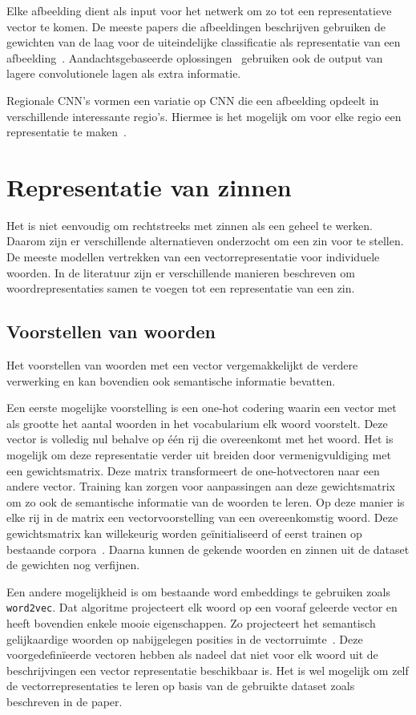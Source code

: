 Elke afbeelding dient als input voor het netwerk om zo tot een representatieve vector te komen. De meeste papers die afbeeldingen beschrijven gebruiken de gewichten van de laag voor de uiteindelijke classificatie als representatie van een afbeelding~\cite{Chen2014,Karpathy2015,Mao2014a,Google}. Aandachtsgebaseerde oplossingen~\cite{Jin2015,Xu2015} gebruiken ook de output van lagere convolutionele lagen als extra informatie.

Regionale CNN's vormen een variatie op CNN die een afbeelding opdeelt in verschillende interessante regio's. Hiermee is het mogelijk om voor elke regio een representatie te maken~\cite{Karpathy2015,Mitchell2015}. 

\section{Representatie van zinnen}
Het is niet eenvoudig om rechtstreeks met zinnen als een geheel te werken. Daarom zijn er verschillende alternatieven onderzocht om een zin voor te stellen.
De meeste modellen vertrekken van een vectorrepresentatie voor individuele woorden. In de literatuur zijn er verschillende manieren beschreven om woordrepresentaties samen te voegen tot een representatie van een zin.

\subsection{Voorstellen van woorden}
 Het voorstellen van woorden met een vector vergemakkelijkt de verdere verwerking en kan bovendien ook semantische informatie bevatten.

 Een eerste mogelijke voorstelling is een one-hot codering waarin een vector met als grootte het aantal woorden in het vocabularium elk woord voorstelt. Deze vector is volledig nul behalve op \'e\'en rij die overeenkomt met het woord. Het is mogelijk om deze representatie verder uit breiden door vermenigvuldiging met een gewichtsmatrix. Deze matrix transformeert de one-hotvectoren naar een andere vector. Training kan zorgen voor aanpassingen aan deze gewichtsmatrix om zo ook de semantische informatie van de woorden te leren. Op deze manier is elke rij in de matrix een vectorvoorstelling van een overeenkomstig woord. Deze gewichtsmatrix kan willekeurig worden ge\"initialiseerd of eerst trainen op bestaande corpora~\cite{Lebret2013,Mao2014a,Google}. Daarna kunnen de gekende woorden en zinnen uit de dataset de gewichten nog verfijnen.  

 Een andere mogelijkheid is om bestaande word embeddings te gebruiken zoals \texttt{word2vec}. Dat algoritme projecteert elk woord op een vooraf geleerde vector en heeft bovendien enkele mooie eigenschappen. Zo projecteert het semantisch gelijkaardige woorden op nabijgelegen posities in de vectorruimte~\cite{Mikolov2013}. Deze voorgedefin\"ieerde vectoren hebben als nadeel dat niet voor elk woord uit de beschrijvingen een vector representatie beschikbaar is. Het is wel mogelijk om zelf de vectorrepresentaties te leren op basis van de gebruikte dataset zoals beschreven in de paper.

